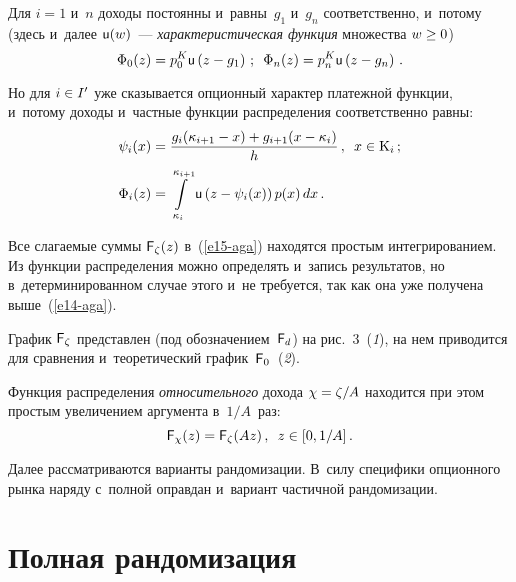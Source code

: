 \begin{multicols}{2}
Для $i = 1$ и~$n$ доходы постоянны и~равны~$g_1$ и~$g_n$ соответственно, 
и~потому (здесь и~далее ${\sf u}(w)$~---  \textit{характеристическая функция} 
множества $w\hm\geq  0$)
$$
\Phi_0(z)=p_0^K{\sf u}\left(z-g_1\right)\,;\enskip \Phi_n(z)=p_n^K{\sf u}\left( z-
g_n\right)\,.
$$
  
  Но для $ i\hm\in I^\prime$ уже сказывается опционный характер платежной 
функции, и~потому доходы и~частные функции распределения соответственно 
равны:
  \begin{align*}
  \psi_i(x)&=\displaystyle\frac{\displaystyle g_i(\kappa_{i+1}-x)+g_{i+1}(x-\kappa_i)\mathstrut}{\displaystyle h\mathstrut}\,,\enskip x\in 
\mathrm{K}_i\,;\\
  \Phi_i(z)&=\int\limits_{\kappa_i}^{\kappa_{i+1}} {\sf u}\left(z-\psi_i(x)\right) 
p(x)\,dx\,.
  \end{align*}
  
  Все слагаемые суммы ${\sf F}_\zeta(z)$ в~(\ref{e15-aga}) находятся прос\-тым 
интегрированием. Из функции распределения можно определять и~запись 
результатов, но в~детерминированном случае этого и~не требуется, так как она 
уже получена выше~(\ref{e14-aga}). 
  
  График ${\sf F}_\zeta$ представлен (под обозначением~${\sf F}_d$) на 
  рис.~3~(\textit{1}), на нем приводится для сравнения и~теоретический 
график~${\sf F}_0$~(\textit{2}). 


  Функция распределения \textit{относительного} дохода $\chi\hm= \zeta/A$ 
находится при этом простым увеличением аргумента в~$1/A$~раз:
  $$
  {\sf F}_\chi(z)={\sf F}_\zeta(Az)\,,\enskip z\in [0, 1/A]\,.
  $$
  
  Далее рассматриваются варианты рандомизации. В~силу специфики 
опционного рынка наряду с~полной оправдан и~вариант частичной 
рандомизации.
  
  \section{Полная рандомизация}
  

\end{multicols}
